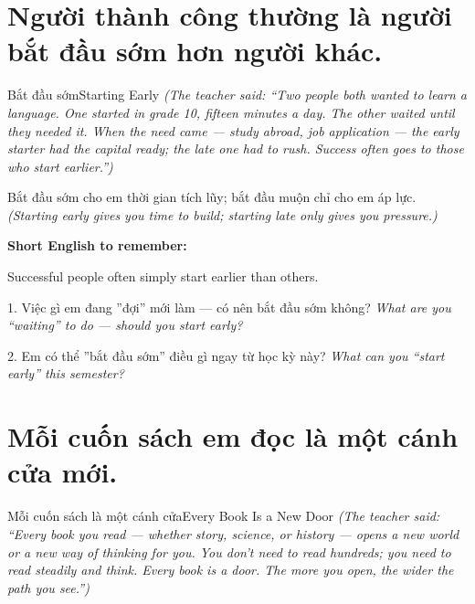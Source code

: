\section{Người thành công thường là người bắt đầu sớm hơn người khác.}
\begin{truyen}{Bắt đầu sớm}{Starting Early}
\textit{(The teacher said: ``Two people both wanted to learn a language. One started in grade 10, fifteen minutes a day. The other waited until they needed it. When the need came — study abroad, job application — the early starter had the capital ready; the late one had to rush. Success often goes to those who start earlier.'')}
\end{truyen}

\begin{baihoc}
Bắt đầu sớm cho em thời gian tích lũy; bắt đầu muộn chỉ cho em áp lực.
\textit{(Starting early gives you time to build; starting late only gives you pressure.)}
\end{baihoc}

\begin{ghinhoanh}
\textbf{Short English to remember:}

Successful people often simply start earlier than others.

\end{ghinhoanh}

\begin{tuhocnhanh}
1. Việc gì em đang ''đợi'' mới làm — có nên bắt đầu sớm không? \textit{What are you ``waiting'' to do — should you start early?}

2. Em có thể ''bắt đầu sớm'' điều gì ngay từ học kỳ này? \textit{What can you ``start early'' this semester?}
\end{tuhocnhanh}
\ngancach

\section{Mỗi cuốn sách em đọc là một cánh cửa mới.}
\begin{truyen}{Mỗi cuốn sách là một cánh cửa}{Every Book Is a New Door}
\textit{(The teacher said: ``Every book you read — whether story, science, or history — opens a new world or a new way of thinking for you. You don't need to read hundreds; you need to read steadily and think. Every book is a door. The more you open, the wider the path you see.'')}
\end{truyen}


